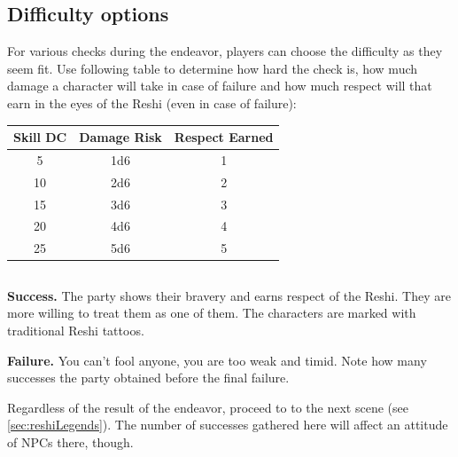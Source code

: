 


\subsection{Difficulty options}

For various checks during the endeavor, players can choose the difficulty as they seem fit. Use following table to determine how hard the check is, how much damage a character will take in case of failure and how much respect will that earn in the eyes of the Reshi (even in case of failure):
\newline

\begin{tabular}{c c c}
	Skill DC & Damage Risk & Respect Earned \\ \hline
	5 & 1d6 & 1 \\
	10 & 2d6 & 2 \\
	15 & 3d6 & 3 \\
	20 & 4d6 & 4 \\
	25 & 5d6 & 5 \\
\end{tabular}

\subsection{\pursuitResolveHeader}


\textbf{Success.} The party shows their bravery and earns respect of the Reshi. They are more willing to treat them as one of them. The characters are marked with traditional Reshi tattoos.

\textbf{Failure.} You can't fool anyone, you are too weak and timid. Note how many successes the party obtained before the final failure.

Regardless of the result of the endeavor, proceed to to the next scene (see \ref{sec:reshiLegends}). The number of successes gathered here will affect an attitude of NPCs there, though.